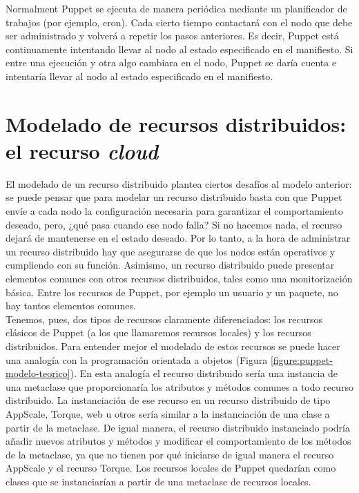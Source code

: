 Normalment Puppet se ejecuta de manera periódica mediante un planificador de trabajos (por ejemplo, cron). Cada cierto tiempo contactará con el nodo que debe ser administrado y volverá a repetir los pasos anteriores. Es decir, Puppet está continuamente intentando llevar al nodo al estado especificado en el manifiesto. Si entre una ejecución y otra algo cambiara en el nodo, Puppet se daría cuenta e intentaría llevar al nodo al estado especificado en el manifiesto.


\section{Modelado de recursos distribuidos: el recurso \emph{cloud}}

El modelado de un recurso distribuido plantea ciertos desafíos al modelo anterior: se puede pensar que para modelar un recurso distribuido basta con que Puppet envíe a cada nodo la configuración necesaria para garantizar el comportamiento deseado, pero, ¿qué pasa cuando ese nodo falla? Si no hacemos nada, el recurso dejará de mantenerse en el estado deseado. Por lo tanto, a la hora de administrar un recurso distribuido hay que asegurarse de que los nodos están operativos y cumpliendo con su función. Asimismo, un recurso distribuido puede presentar elementos comunes con otros recursos distribuidos, tales como una monitorización básica. Entre los recursos de Puppet, por ejemplo un usuario y un paquete, no hay tantos elementos comunes. \\

Tenemos, pues, dos tipos de recursos claramente diferenciados: los recursos clásicos de Puppet (a los que llamaremos recursos locales) y los recursos distribuidos. Para entender mejor el modelado de estos recursos se puede hacer una analogía con la programación orientada a objetos (Figura \ref{figure:puppet-modelo-teorico}). En esta analogía el recurso distribuido sería una instancia de una metaclase que proporcionaría los atributos y métodos comunes a todo recurso distribuido. La instanciación de ese recurso en un recurso distribuido de tipo AppScale, Torque, web u otros sería similar a la instanciación de una clase a partir de la metaclase. De igual manera, el recurso distribuido instanciado podría añadir nuevos atributos y métodos y modificar el comportamiento de los métodos de la metaclase, ya que no tienen por qué iniciarse de igual manera el recurso AppScale y el recurso Torque. Los recursos locales de Puppet quedarían como clases que se instanciarían a partir de una metaclase de recursos locales.

